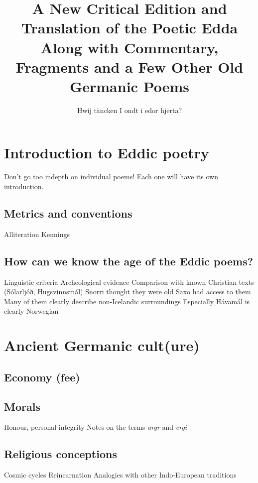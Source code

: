 \title{%
  A New Critical Edition and Translation of the Poetic Edda \\
  \large Along with Commentary, Fragments and a Few Other Old Germanic Poems}

\author{Hwij täncken I ondt i edor hjerta?}

\maketitle

\newpage


\tableofcontents

\chapter{Introduction to Eddic poetry}
  Don't go too indepth on individual poems! Each one will have its own introduction.
  \section{Metrics and conventions}
    Alliteration
    Kennings
  \section{How can we know the age of the Eddic poems?}
    Linguistic criteria
    Archeological evidence
    Comparison with known Christian texts (Sólarljóð, Hugsvinnsmál)
    Snorri thought they were old
    Saxo had access to them
    Many of them clearly describe non-Icelandic surroundings
      Especially Hávamál is clearly Norwegian

\chapter{Ancient Germanic cult(ure)}
  \section{Economy (fee)}
  \section{Morals}
    Honour, personal integrity
    Notes on the terms \emph{argr} and \emph{ergi}
  \section{Religious conceptions}
    Cosmic cycles
    Reincarnation
    Analogies with other Indo-European traditions

